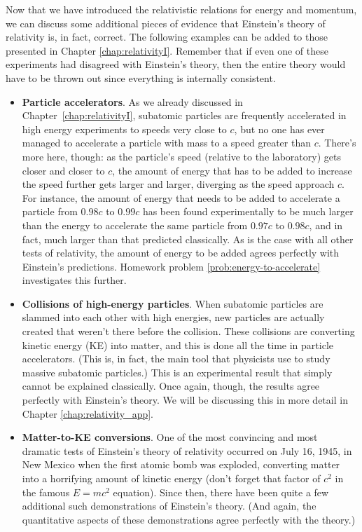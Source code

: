 Now that we have introduced the relativistic relations for energy and
momentum, we can discuss some additional pieces of evidence that
Einstein's theory of relativity is, in fact, correct.  The following
examples can be added to those presented in Chapter
\ref{chap:relativityI}.  Remember that if even one of these
experiments had disagreed with Einstein's theory, then the entire
theory would have to be thrown out since everything is internally
consistent.
\begin{itemize}
\item \textbf{Particle accelerators}. As we already discussed in
Chapter~\ref{chap:relativityI}, subatomic particles are frequently
accelerated in high energy experiments to speeds very close to $c$,
but no one has ever managed to accelerate a particle with mass to a
speed greater than $c$.  There's more here, though: as the particle's
speed (relative to the laboratory) gets closer and closer to $c$, the
amount of energy that has to be added to increase the speed further
gets larger and larger, diverging as the speed approach $c$.  For
instance, the amount of energy that needs to be added to accelerate a
particle from $0.98c$ to $0.99c$ has been found experimentally to be much
larger than the energy to accelerate the same particle from $0.97c$ to
$0.98c$, and in fact, much larger than that predicted classically.  As
is the case with all other tests of relativity, the amount of energy
to be added agrees perfectly with Einstein's predictions.  Homework
problem \ref{prob:energy-to-accelerate}  investigates this further.
\item \textbf{Collisions of high-energy particles}.  When subatomic
particles are slammed into each other with high energies, new
particles are actually created that weren't there before the
collision.  These collisions are converting kinetic energy (KE) into
matter, and this is done all the time in particle accelerators.  (This
is, in fact, the main tool that physicists use to study massive
subatomic particles.)  This is an experimental result that simply
cannot be explained classically.  Once again, though, the results
agree perfectly with Einstein's theory.  We will be discussing this in
more detail in Chapter \ref{chap:relativity_app}. 
\item \textbf{Matter-to-KE conversions}.  One of the most convincing and
most dramatic tests of Einstein's theory of relativity occurred on
July 16, 1945, in New Mexico when the first atomic bomb was exploded,
converting matter into a horrifying amount of kinetic energy (don't
forget that factor of $c^2$ in the famous $E = mc^2$ equation).  Since
then, there have been quite a few additional such demonstrations of
Einstein's theory.  (And again, the quantitative aspects of these
demonstrations agree perfectly with the theory.)
    

\end{itemize}
